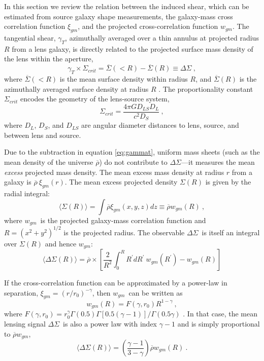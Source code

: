\documentclass{emulateapj}
\newcommand{\deltasig}{$\Delta \Sigma$}
\newcommand{\wgm}{$w_{gm}$}
\begin{document}
In this section 
we review the relation between the induced 
shear, which can be estimated from source galaxy shape measurements, 
the 
galaxy-mass cross correlation function $\xi_{gm}$, and the projected 
cross-correlation function \wgm. 
The tangential shear, $\gamma_T$, azimuthally averaged over a thin annulus 
at projected radius $R$ from a lens galaxy, is
directly related to the projected surface mass density of the lens within the
aperture, 
\begin{equation} \label{eq:gammat}
\gamma_T \times \Sigma_{crit} =  \overline{\Sigma}(< R) -\overline{\Sigma}(R)
\equiv \Delta \Sigma ~,
\end{equation}
where $\overline{\Sigma}(< R)$ is the mean surface density within radius $R$, 
and $\overline{\Sigma}(R)$ is the azimuthally averaged surface density at
radius $R$ \citep{Escude91,Kaiser94,Wilson01}.  The proportionality constant
$\Sigma_{crit}$ encodes the geometry of the lens-source system,
\begin{equation} \label{eq:sigmacrit}
\Sigma_{crit} = \frac{4 \pi G D_{LS} D_L}{c^2 D_S}~,
\end{equation}
where $D_{L}$, $D_S$, and $D_{LS}$ 
are angular diameter distances to lens, source, and between
lens and source.  

Due to the
subtraction in equation \ref{eq:gammat}, uniform mass sheets (such as the mean density
of the universe $\overline{\rho}$) 
do not contribute to \deltasig---it measures the mean {\it excess}
projected mass density.
The mean excess mass density at radius $r$ from a galaxy is
$\overline{\rho}~\xi_{gm}(r)$. The mean excess projected 
density $\Sigma(R)$ is given by the radial integral:
\begin{equation}
\langle \Sigma(R) \rangle = 
      \int \overline{\rho} \xi_{gm}(x,y,z) dz \equiv \overline{\rho} w_{gm}(R) ~, 
\end{equation}
where \wgm\ is the projected galaxy-mass correlation function and $R = (x^2 +
y^2)^{1/2}$ is the projected radius.  The observable \deltasig\ is itself an integral
over $\Sigma(R)$ and hence \wgm:
\begin{equation} \label{deltasig_and_wgm}
\langle \Delta\Sigma(R) \rangle = \overline{\rho} \times \left[ \frac{2}{R^2} 
\int_0^R R^\prime dR^\prime ~w_{gm}(R^\prime) -w_{gm}(R) \right]
\end{equation}

If the cross-correlation function can be approximated by a power-law in separation, 
$\xi_{gm} = (r/r_0)^{-\gamma}$, then \wgm\ can
be written as
\begin{equation} \label{xigm_def}
w_{gm}(R)  =  F(\gamma, r_0) R^{1-\gamma} ~,
\end{equation}
where $ F(\gamma, r_0) = r_0^{\gamma}
\Gamma(0.5)\Gamma[0.5(\gamma-1)]/\Gamma(0.5\gamma)$ \citep{DavisPeebles83}.  In
that case, the mean lensing signal \deltasig\ is also a power law with index $\gamma
- 1$ and is simply proportional to $\overline{\rho}w_{gm}$,
\begin{equation} \label{deltasig2wgm}
\langle \Delta \Sigma (R)\rangle = \left(
\frac{\gamma -1}{3-\gamma} \right)\overline{\rho} w_{gm}(R)~.
\end{equation}
\end{document}
